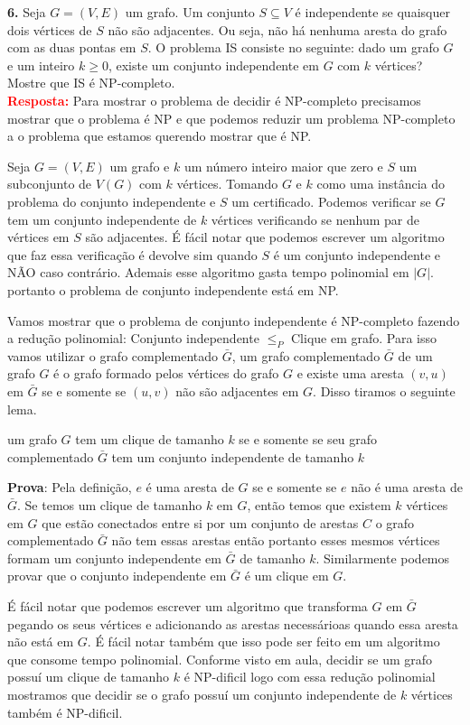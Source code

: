 
\noindent\textbf{6.} Seja $G = (V, E)$ um grafo. Um conjunto $S \subseteq V$ é independente se quaisquer dois vértices de $S$ não são adjacentes. Ou seja, não há nenhuma aresta do grafo com as duas pontas em $S$. O problema
IS consiste no seguinte: dado um grafo $G$ e um inteiro $k \geq 0$, existe um conjunto independente em $G$ com $k$ vértices? Mostre que IS é NP-completo.\\[6pt]
\textcolor{red}{\textbf{Resposta:}} Para mostrar o problema de decidir é NP-completo precisamos mostrar que o problema é NP e que podemos reduzir um problema NP-completo a o problema que estamos querendo mostrar que é NP.

Seja $G = (V, E)$ um grafo e $k$ um número inteiro maior que zero e $S$ um subconjunto de $V(G)$ com $k$ vértices. Tomando $G$ e $k$ como uma instância do problema do conjunto independente e $S$ um certificado. Podemos verificar se $G$ tem um conjunto independente de $k$ vértices verificando se nenhum par de vértices em $S$ são adjacentes. É fácil notar que podemos escrever um algoritmo que faz essa verificação é devolve sim quando $S$ é um conjunto independente e NÃO caso contrário. Ademais esse algoritmo gasta tempo polinomial em $|G|$. portanto o problema de conjunto independente está em NP.

Vamos mostrar que o problema de conjunto independente é NP-completo fazendo a redução polinomial: Conjunto independente $\leq_P$ Clique em grafo. Para isso vamos utilizar o grafo complementado $\bar{G}$, um grafo complementado $\bar{G}$ de um grafo $G$ é o grafo formado pelos vértices do grafo $G$ e existe uma aresta $(v,u)$ em $\bar{G}$ se e somente se $(u,v)$ não são adjacentes em $G$. Disso tiramos o seguinte lema.

\begin{lemma}
 \: um grafo $G$ tem um clique de tamanho $k$ se e somente se seu grafo complementado $\bar{G}$ tem um conjunto independente de tamanho $k$
\end{lemma}

\textbf{Prova}: Pela definição, $e$ é uma aresta de $G$ se e somente se $e$ não é uma aresta de $\bar{G}$. Se temos um clique de tamanho $k$ em $G$, então temos que existem $k$ vértices em $G$ que estão conectados entre si por um conjunto de arestas $C$ o grafo complementado $\bar{G}$ não tem essas arestas então portanto esses mesmos vértices formam um conjunto independente em $\bar{G}$ de tamanho $k$. Similarmente podemos provar que o conjunto independente em $\bar{G}$ é um clique em $G$.

É fácil notar que podemos escrever um algoritmo que transforma $G$ em $\bar{G}$ pegando os seus vértices e adicionando as arestas necessárioas quando essa aresta não está em $G$. É fácil notar também que isso pode ser feito em um algoritmo que consome tempo polinomial. Conforme visto em aula, decidir se um grafo possuí um clique de tamanho $k$ é NP-dificil logo com essa redução polinomial mostramos que decidir se o grafo possuí um conjunto independente de $k$ vértices também é NP-dificil. \\[6pt]
